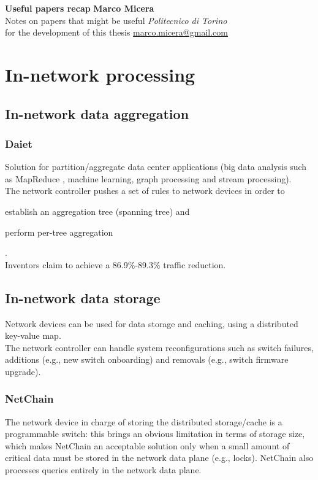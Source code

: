 \documentclass[a4paper, 11pt]{article}
\begin{document}
\noindent
\large\textbf{Useful papers recap} \hfill \textbf{Marco Micera} \\
\normalsize Notes on papers that might be useful \hfill \textit{Politecnico di Torino} \\
\normalsize for the development of this thesis \hfill \href{mailto:marco.micera@gmail.com}{marco.micera@gmail.com}

\section{In-network processing}

\subsection{In-network data aggregation}
\subsubsection{Daiet \cite{daiet}}
Solution for partition/aggregate data center applications (big data analysis such as MapReduce \cite{mapreduce}, machine learning, graph processing and stream processing).\\
The network controller pushes a set of rules to network devices in order to
\begin{mylist}
    \item establish an aggregation tree (spanning tree) and
    \item perform per-tree aggregation
\end{mylist}.\\ 
Inventors claim to achieve a 86.9\%-89.3\% traffic reduction.

\subsection{In-network data storage}
Network devices can be used for data storage and caching, using a distributed key-value map.\\
The network controller can handle system reconfigurations such as switch failures, additions (e.g., new switch onboarding) and removals (e.g., switch firmware upgrade).
\subsubsection{NetChain \cite{netchain}}
The network device in charge of storing the distributed storage/cache is a programmable switch: this brings an obvious limitation in terms of storage size, which makes NetChain \cite{netchain} an acceptable solution only when a small amount of critical data must be stored in the network data plane (e.g., locks). NetChain \cite{netchain} also processes queries entirely in the network data plane.
\end{document}
